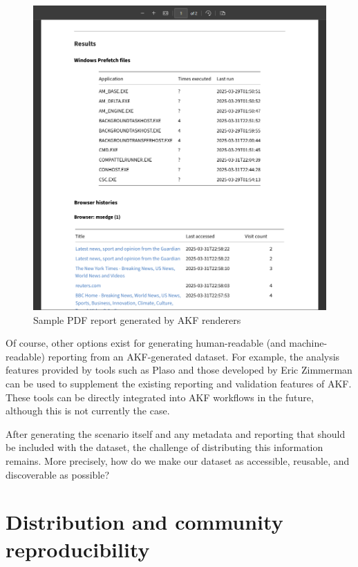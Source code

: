 \documentclass[letterpaper,12pt]{report}
\begin{document}
\begin{figure}[htbp]
\centering
\includegraphics[width=1\linewidth]{human-reporting.png}
\caption{Sample PDF report generated by AKF
renderers}\label{fig:scenario-report}
\end{figure}

Of course, other options exist for generating human-readable (and
machine-readable) reporting from an AKF-generated dataset. For example,
the analysis features provided by tools such as Plaso
\cite{Log2timelinePlaso2025} and those developed by Eric Zimmerman
\cite{zimmermanEricZimmermansTools} can be used to supplement the
existing reporting and validation features of AKF. These tools can be
directly integrated into AKF workflows in the future, although this is
not currently the case.

After generating the scenario itself and any metadata and reporting that
should be included with the dataset, the challenge of distributing this
information remains. More precisely, how do we make our dataset as
accessible, reusable, and discoverable as possible?

\section{Distribution and community
reproducibility}\label{distribution-and-community-reproducibility}
\end{document}
